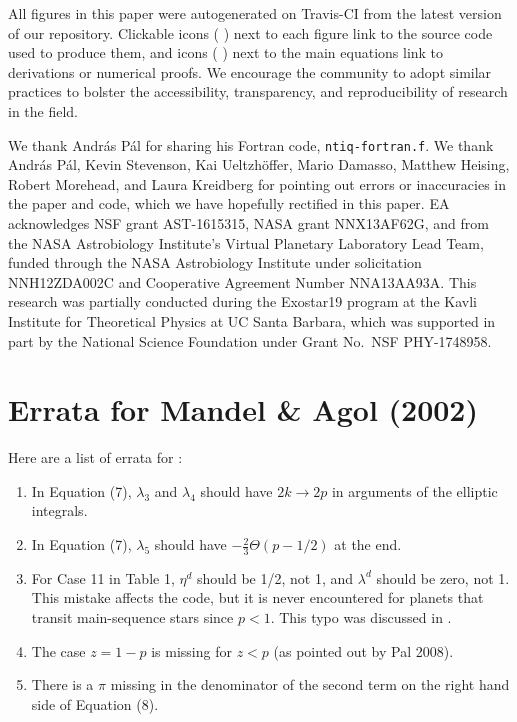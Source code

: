 \documentclass[modern,trackchanges]{aastex63}
\begin{document}
All figures in this paper were autogenerated on Travis-CI from the latest
version of our repository. Clickable icons (\,\codeicon\,) next to each figure link
to the source code used to produce them, and icons (\,\prooficon\,) next to the main 
equations link to derivations or numerical proofs. We encourage the community
to adopt similar practices to bolster the accessibility, transparency, and
reproducibility of research in the field.


\acknowledgements

We thank Andr\'as P\'al for sharing his Fortran code, \texttt{ntiq-fortran.f}.
We thank Andr\'as P\'al, Kevin Stevenson, Kai Ueltzh\"offer, Mario Damasso,
Matthew Heising, Robert Morehead, and Laura Kreidberg for pointing out
errors or inaccuracies in the \cite{MandelAgol2002} paper and code, which we have
hopefully rectified in this paper.
EA acknowledges NSF grant AST-1615315, NASA grant NNX13AF62G, and from
the NASA Astrobiology Institute's Virtual Planetary Laboratory Lead Team,
funded through the NASA Astrobiology Institute under solicitation NNH12ZDA002C
and Cooperative Agreement Number NNA13AA93A.  This research was partially 
conducted during the Exostar19 program at the Kavli Institute for Theoretical 
Physics at UC Santa Barbara, which was supported in part by the National 
Science Foundation under Grant No.\ NSF PHY-1748958.



\appendix

\section{Errata for Mandel \& Agol (2002)}

Here are a list of errata for \citet{MandelAgol2002}:
\begin{enumerate}
\item In Equation (7), $\lambda_3$ and $\lambda_4$ should have $2k \rightarrow
2p$ in arguments of the elliptic integrals.

\item In Equation (7), $\lambda_5$ should have $- \frac{2}{3}\Theta(p-1/2)$
at the end.

\item For Case 11 in Table 1, $\eta^d$ should be 1/2, not 1, and
$\lambda^d$ should be zero, not 1.  This mistake affects the code,
but it is never encountered for planets that transit main-sequence
stars since $p<1$.  This typo was discussed in \citet{Eastman2013}.

\item The case $z=1-p$ is missing for $z<p$ (as pointed out by
Pal 2008).

\item There is a $\pi$ missing in the denominator of the second term
on the right hand side of Equation (8).
\end{enumerate}
\end{document}
